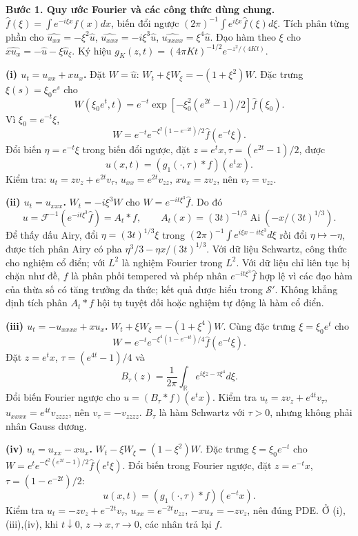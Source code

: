 \textbf{Bước 1. Quy ước Fourier và các công thức dùng chung.}
$\widehat f(\xi)=\int e^{-i\xi x}f(x)dx$, biến đổi ngược $(2\pi)^{-1}\int e^{i\xi x}\widehat f(\xi)d\xi$. Tích phân từng phần cho $\widehat{u_{xx}}=-\xi^2\widehat u$, $\widehat{u_{xxx}}=-i\xi^3\widehat u$, $\widehat{u_{xxxx}}=\xi^4\widehat u$. Đạo hàm theo $\xi$ cho $\widehat{xu_x}=-\widehat u-\xi\widehat u_\xi$. Ký hiệu $g_K(z,t)=(4\pi Kt)^{-1/2}e^{-z^2/(4Kt)}$.

\textbf{(i) $u_t=u_{xx}+xu_x$.}
Đặt $W=\widehat u$: $W_t+\xi W_\xi=-(1+\xi^2)W$. Đặc trưng $\xi(s)=\xi_0e^s$ cho
\[W(\xi_0e^t,t)=e^{-t}\exp[-\xi_0^2(e^{2t}-1)/2]\widehat f(\xi_0).\]
Vì $\xi_0=e^{-t}\xi$,
\[W=e^{-t}e^{-\xi^2(1-e^{-2t})/2}\widehat f(e^{-t}\xi).\]
Đổi biến $\eta=e^{-t}\xi$ trong biến đổi ngược, đặt $z=e^tx,\tau=(e^{2t}-1)/2$, được
\[u(x,t)=(g_1(\cdot,\tau)*f)(e^tx).\]
Kiểm tra: $u_t=zv_z+e^{2t}v_\tau$, $u_{xx}=e^{2t}v_{zz}$, $xu_x=zv_z$, nên $v_\tau=v_{zz}$.

\textbf{(ii) $u_t=u_{xxx}$.}
$W_t=-i\xi^3W$ cho $W=e^{-it\xi^3}\widehat f$. Do đó
\[u=\mathcal F^{-1}(e^{-it\xi^3}\widehat f)=A_t*f,\qquad
A_t(x)=(3t)^{-1/3}\operatorname{Ai}(-x/(3t)^{1/3}).\]
Để thấy dấu Airy, đổi $\eta=(3t)^{1/3}\xi$ trong $(2\pi)^{-1}\int e^{i\xi x-it\xi^3}d\xi$ rồi đổi $\eta\mapsto-\eta$, được tích phân Airy có pha $\eta^3/3-\eta x/(3t)^{1/3}$. Với dữ liệu Schwartz, công thức cho nghiệm cổ điển; với $L^2$ là nghiệm Fourier trong $L^2$. Với dữ liệu chỉ liên tục bị chặn như đề, $f$ là phân phối tempered và phép nhân $e^{-it\xi^3}\widehat f$ hợp lệ vì các đạo hàm của thừa số có tăng trưởng đa thức; kết quả được hiểu trong $\mathcal S'$. Không khẳng định tích phân $A_t*f$ hội tụ tuyệt đối hoặc nghiệm tự động là hàm cổ điển.

\textbf{(iii) $u_t=-u_{xxxx}+xu_x$.}
$W_t+\xi W_\xi=-(1+\xi^4)W$. Cùng đặc trưng $\xi=\xi_0e^t$ cho
\[W=e^{-t}e^{-\xi^4(1-e^{-4t})/4}\widehat f(e^{-t}\xi).\]
Đặt $z=e^tx$, $\tau=(e^{4t}-1)/4$ và
\[B_\tau(z)=\frac1{2\pi}\int_{\mathbb R}e^{i\xi z-\tau\xi^4}d\xi.\]
Đổi biến Fourier ngược cho $u=(B_\tau*f)(e^tx)$. Kiểm tra $u_t=zv_z+e^{4t}v_\tau$, $u_{xxxx}=e^{4t}v_{zzzz}$, nên $v_\tau=-v_{zzzz}$. $B_\tau$ là hàm Schwartz với $\tau>0$, nhưng không phải nhân Gauss dương.

\textbf{(iv) $u_t=u_{xx}-xu_x$.}
$W_t-\xi W_\xi=(1-\xi^2)W$. Đặc trưng $\xi=\xi_0e^{-t}$ cho $W=e^t e^{-\xi^2(e^{2t}-1)/2}\widehat f(e^t\xi)$. Đổi biến trong Fourier ngược, đặt $z=e^{-t}x$, $\tau=(1-e^{-2t})/2$:
\[u(x,t)=(g_1(\cdot,\tau)*f)(e^{-t}x).\]
Kiểm tra $u_t=-zv_z+e^{-2t}v_\tau$, $u_{xx}=e^{-2t}v_{zz}$, $-xu_x=-zv_z$, nên đúng PDE. Ở (i),(iii),(iv), khi $t\downarrow0$, $z\to x,\tau\to0$, các nhân trả lại $f$.

